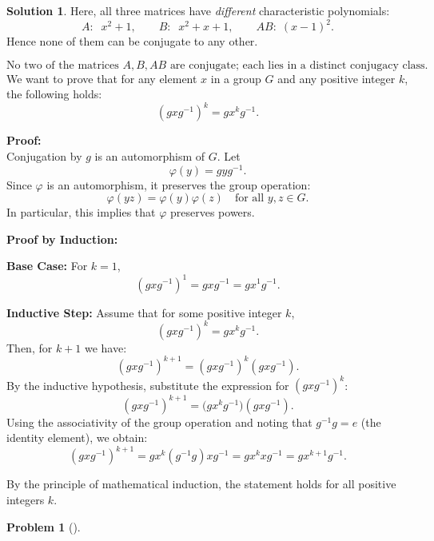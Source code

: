 \documentclass[12pt]{article}
\theoremstyle{definition} %
\newtheorem{solution}{Solution}
\newtheorem{problem}{Problem}
\theoremstyle{plain} %
\begin{document}
\begin{solution}
Here, all three matrices have \emph{different} characteristic polynomials:
\[
A:\;\;x^2+1,\qquad
B:\;\;x^2+x+1,\qquad
AB:\;(x-1)^2.
\]
Hence none of them can be conjugate to any other.  

\[
\boxed{\text{No two of the matrices \(A,B,AB\) are conjugate; each lies in a distinct conjugacy class.}}
\]
We want to prove that for any element \(x\) in a group \(G\) and any positive integer \(k\), the following holds:
\[
(gxg^{-1})^k = gx^kg^{-1}.
\]

\textbf{Proof:} \\
Conjugation by \(g\) is an automorphism of \(G\). Let
\[
\varphi(y) = g y g^{-1}.
\]
Since \(\varphi\) is an automorphism, it preserves the group operation:
\[
\varphi(yz) = \varphi(y)\varphi(z) \quad \text{for all } y,z \in G.
\]
In particular, this implies that \(\varphi\) preserves powers.

\textbf{Proof by Induction:}

\textbf{Base Case:} For \(k=1\),
\[
(gxg^{-1})^1 = gxg^{-1} = gx^1g^{-1}.
\]

\textbf{Inductive Step:} Assume that for some positive integer \(k\),
\[
(gxg^{-1})^k = gx^kg^{-1}.
\]
Then, for \(k+1\) we have:
\[
(gxg^{-1})^{k+1} = (gxg^{-1})^k (gxg^{-1}).
\]
By the inductive hypothesis, substitute the expression for \((gxg^{-1})^k\):
\[
(gxg^{-1})^{k+1} = \bigl(gx^kg^{-1}\bigr)(gxg^{-1}).
\]
Using the associativity of the group operation and noting that \(g^{-1}g = e\) (the identity element), we obtain:
\[
(gxg^{-1})^{k+1} = gx^k (g^{-1}g) xg^{-1} = gx^k xg^{-1} = gx^{k+1}g^{-1}.
\]

By the principle of mathematical induction, the statement holds for all positive integers \(k\).

\end{solution}
\begin{problem}[]
    
\end{problem}
\end{document}

